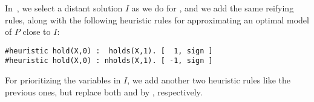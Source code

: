 In~,
we select a distant solution $I$ as we do for , 
and we add the same reifying rules, 
along with the following heuristic rules for approximating an optimal model of $P$ close to $I$:
\begin{lstlisting}
#heuristic hold(X,0) :  holds(X,1). [  1, sign ]
#heuristic hold(X,0) : nholds(X,1). [ -1, sign ]
\end{lstlisting}
For prioritizing the variables in $I$, we add another two heuristic rules like the previous ones, 
but replace both \lm{[ 1, sign ]} and \lm{[ -1, sign ]} by \lm{[ 1, level ]}, respectively.
%

